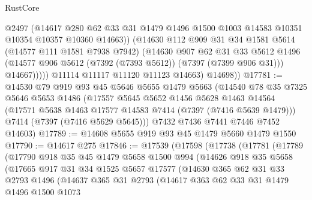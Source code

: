 \begin{lexlean}{RustCore}
\begin{coremodule}
                  @2497
                  (@14617
                    @280
                    @62
                    @33
                    @31
                    @1479
                    @1496
                    @1500
                    @1003
                    @14583
                    @10351
                    @10354
                    @10357
                    @10360
                    @14663))
                (@14630
                  @112
                  @909
                  @31
                  @34
                  @1581
                  @5614
                  (@14577 @111 @1581 @7938 @7942)
                  (@14630
                    @907
                    @62
                    @31
                    @33
                    @5612
                    @1496
                    (@14577 @906 @5612 (@7392 (@7393 @5612)) (@7397 (@7399 @906 @31)))
                    @14667)))))
          @11114
          @11117
          @11120
          @11123
          @14663)
        @14698))
@17781 := @14530
    @79
    @919
    @93
    @45
    @5646
    @5655
    @1479
    @5663
    (@14540
      @78
      @35
      @7325
      @5646
      @5653
      @1486
      (@17557
        @5645
        @5652
        @1456
        @5628
        @1463
        @14564
        (@17571 @5638 @1463 @17577 @14583 @7414 (@7397 (@7416 @5639 @1479)))
        @7414
        (@7397 (@7416 @5629 @5645)))
      @7432
      @7436
      @7441
      @7446
      @7452
      @14603)
@17789 := @14608 @5655 @919 @93 @45 @1479 @5660 @1479 @1550
@17790 := @14617 @275
@17846 := @17539
    (@17598
      (@17738
        (@17781
          (@17789
            (@17790
              @918
              @35
              @45
              @1479
              @5658
              @1500
              @994
              (@14626
                @918
                @35
                @5658
                (@17665
                  @917
                  @31
                  @34
                  @1525
                  @5657
                  @17577
                  (@14630
                    @365
                    @62
                    @31
                    @33
                    @2793
                    @1496
                    (@14637
                      @365
                      @31
                      @2793
                      (@14617
                        @363
                        @62
                        @33
                        @31
                        @1479
                        @1496
                        @1500
                        @1073

\end{coremodule}
\end{lexlean}

